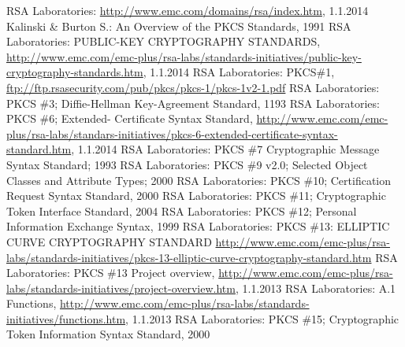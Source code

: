 \documentclass[10pt,a4paper]{article}
\begin{document}
\FloatBarrier
\appendix
\renewcommand{\refname}{\section{Quellen}}
\begin{thebibliography}{}
     RSA Laboratories:
        \url{http://www.emc.com/domains/rsa/index.htm}, 1.1.2014
     Kalinski \& Burton S.: An Overview of the PKCS Standards, 1991
     RSA Laboratories: PUBLIC-KEY CRYPTOGRAPHY
        STANDARDS,
        \url{http://www.emc.com/emc-plus/rsa-labs/standards-initiatives/public-key-cryptography-standards.htm},
        1.1.2014
     RSA Laboratories: PKCS\#1,
        \url{ftp://ftp.rsasecurity.com/pub/pkcs/pkcs-1/pkcs-1v2-1.pdf}
     RSA Laboratories: PKCS \#3; Diffie-Hellman Key-Agreement
        Standard, 1193
     RSA Laboratories: PKCS \#6; Extended- Certificate Syntax
        Standard,
        \url{http://www.emc.com/emc-plus/rsa-labs/standars-initiatives/pkcs-6-extended-certificate-syntax-standard.htm},
        1.1.2014
     RSA Laboratories: PKCS \#7 Cryptographic Message Syntax Standard;
        1993
     RSA Laboratories: PKCS \#9 v2.0; Selected Object Classes and
        Attribute Types; 2000
     RSA Laboratories: PKCS \#10; Certification Request Syntax
        Standard, 2000
     RSA Laboratories: PKCS \#11; Cryptographic Token Interface
        Standard, 2004
     RSA Laboratories: PKCS \#12; Personal Information Exchange
        Syntax, 1999
     RSA Laboratories: PKCS \#13: ELLIPTIC CURVE CRYPTOGRAPHY
        STANDARD
        \url{http://www.emc.com/emc-plus/rsa-labs/standards-initiatives/pkcs-13-elliptic-curve-cryptography-standard.htm}
     RSA Laboratories: PKCS \#13 Project overview,
        \url{http://www.emc.com/emc-plus/rsa-labs/standards-initiatives/project-overview.htm},
        1.1.2013
     RSA Laboratories: A.1 Functions,
        \url{http://www.emc.com/emc-plus/rsa-labs/standards-initiatives/functions.htm},
        1.1.2013
     RSA Laboratories: PKCS \#15; Cryptographic Token Information
        Syntax Standard, 2000
\end{thebibliography}
\end{document}

